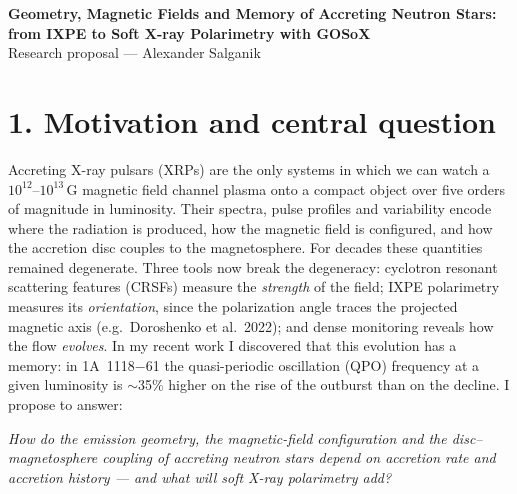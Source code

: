 \documentclass[11pt]{article}
\begin{document}
\begin{center}
{\large\bfseries\color{Accent} Geometry, Magnetic Fields and Memory of Accreting Neutron Stars:\\
from IXPE to Soft X-ray Polarimetry with GOSoX}\\[3pt]
Research proposal --- Alexander Salganik
\end{center}

\section*{1. Motivation and central question}
Accreting X-ray pulsars (XRPs) are the only systems in which we can watch a
$10^{12}$--$10^{13}$\,G magnetic field channel plasma onto a compact object over five
orders of magnitude in luminosity. Their spectra, pulse profiles and variability encode
where the radiation is produced, how the magnetic field is configured, and how the
accretion disc couples to the magnetosphere. For decades these quantities remained
degenerate. Three tools now break the degeneracy: cyclotron resonant scattering
features (CRSFs) measure the \emph{strength} of the field; IXPE polarimetry measures its
\emph{orientation}, since the polarization angle traces the projected magnetic axis
(e.g.\ Doroshenko et al.\ 2022); and dense monitoring reveals how the flow
\emph{evolves}. In my recent work I discovered that this evolution has a memory: in
1A~1118$-$61 the quasi-periodic oscillation (QPO) frequency at a given luminosity is
$\sim$35\% higher on the rise of the outburst than on the decline. I propose to answer:

\textit{How do the emission geometry, the magnetic-field configuration and the
disc--magnetosphere coupling of accreting neutron stars depend on accretion rate and
accretion history --- and what will soft X-ray polarimetry add?}
\end{document}
